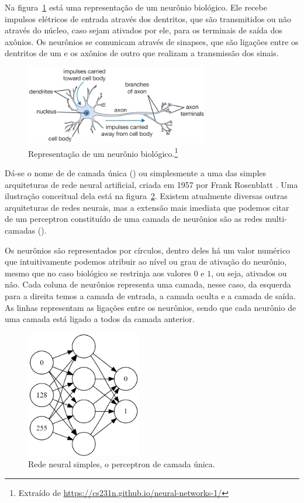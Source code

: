 Na figura~\ref{fig:neuron} está uma representação de um neurônio biológico. Ele recebe impulsos elétricos de entrada através dos dentritos, que são transmitidos ou não através do núcleo, caso sejam ativados por ele, para os terminais de saída dos axônios. Os neurônios se comunicam através de sinapses, que são ligações entre os dentritos de um e os axônios de outro que realizam a transmissão dos sinais. 

\begin{figure}[htb]
\centering
\includegraphics[width=8cm]{figuras/neuron}
\caption{Representação de um neurônio biológico.\footnote{Extraído de \url{https://cs231n.github.io/neural-networks-1/}}}
\label{fig:neuron}
\end{figure}

Dá-se o nome de  de camada única () ou simplesmente  a uma das simples arquiteturas de rede neural artificial, criada em 1957 por Frank Rosenblatt \citep{frank}. Uma ilustração conceitual dela está na figura~\ref{fig:perceptron}. Existem atualmente diversas outras arquiteturas de redes neurais, mas a extensão mais imediata que podemos citar de um perceptron constituído de uma camada de neurônios são as redes  multi-camadas (). 

Os neurônios são representados por círculos, dentro deles há um valor numérico que intuitivamente podemos atribuir ao nível ou grau de ativação do neurônio, mesmo que no caso biológico se restrinja aos valores $0$ e $1$, ou seja, ativados ou não. Cada coluna de neurônios representa uma camada, nesse caso, da esquerda para a direita temos a camada de entrada, a camada oculta e a camada de saída. As linhas representam as ligações entre os neurônios, sendo que cada neurônio de uma camada está ligado a todos da camada anterior.

\begin{figure}[htb]
\centering
\includegraphics[width=5cm]{figuras/perceptron}
\caption{Rede neural simples, o perceptron de camada única.}
\label{fig:perceptron}
\end{figure}

